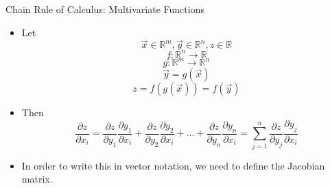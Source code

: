 
\begin{vbframe}{Chain Rule of Calculus: Multivariate Functions}

\vfill

\begin{itemize}
\item Let
$$\vec x \in \mathbb{R}^m, \vec y \in \mathbb{R}^n, z \in \mathbb{R}$$
$$f : \mathbb{R}^n \rightarrow \mathbb{R}$$
$$g : \mathbb{R}^m \rightarrow \mathbb{R}^n$$
$$\vec y = g(\vec x)$$
$$z = f(g(\vec x)) = f(\vec y)$$
\item Then
$$\frac{\partial z}{\partial x_i} = 
		\frac{\partial z}{\partial y_1} \frac{\partial y_1}{\partial x_i} +
		\frac{\partial z}{\partial y_2} \frac{\partial y_2}{\partial x_i} + \ldots +
		\frac{\partial z}{\partial y_n} \frac{\partial y_n}{\partial x_i} =
\sum_{j=1}^n \frac{\partial z}{\partial y_j} \frac{\partial y_j}{\partial x_i}$$
\item In order to write this in vector notation, we need to define the Jacobian matrix.
\end{itemize}
\begin{center}
\end{center}


\vfill

\end{vbframe}




